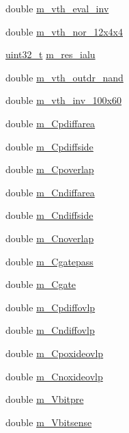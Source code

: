 \begin{DoxyCompactItemize}
\item 
double \hyperlink{classTechParameter_a8f9ab66c94f1883ffcaafa4b021f45a8}{m\_\-vth\_\-eval\_\-inv}
\item 
double \hyperlink{classTechParameter_a2ddcec55aa930cfc11b008d621182ede}{m\_\-vth\_\-nor\_\-12x4x4}
\item 
\hyperlink{Type_8hh_a435d1572bf3f880d55459d9805097f62}{uint32\_\-t} \hyperlink{classTechParameter_a3ae150f46fd55970a337d200f049ef39}{m\_\-res\_\-ialu}
\item 
double \hyperlink{classTechParameter_a3cd69bdb79973a2f4182e31be7838582}{m\_\-vth\_\-outdr\_\-nand}
\item 
double \hyperlink{classTechParameter_aff8cf010ff263ca60e53b1be45a68eb6}{m\_\-vth\_\-inv\_\-100x60}
\item 
double \hyperlink{classTechParameter_a5fe5f3f48a711d8df9b04ff7e0fd533e}{m\_\-Cpdiffarea}
\item 
double \hyperlink{classTechParameter_a4108836653116840cf95fcc824ca4d54}{m\_\-Cpdiffside}
\item 
double \hyperlink{classTechParameter_aa47b17efe11ece0c4a17879612070879}{m\_\-Cpoverlap}
\item 
double \hyperlink{classTechParameter_a50acace6ed30672be08e135f585fa3a0}{m\_\-Cndiffarea}
\item 
double \hyperlink{classTechParameter_ad604e4d831cada7764fc0417ef935e40}{m\_\-Cndiffside}
\item 
double \hyperlink{classTechParameter_a5d8fe6321d36214f3fd7b4313d5be2f4}{m\_\-Cnoverlap}
\item 
double \hyperlink{classTechParameter_acd05c6362e5b40cb41695a312f4a47ca}{m\_\-Cgatepass}
\item 
double \hyperlink{classTechParameter_ab12599ffb7e2b7794c4c6ffd26dff23f}{m\_\-Cgate}
\item 
double \hyperlink{classTechParameter_a6bafcb895f9ee83f48cfe8cf6f9b5044}{m\_\-Cpdiffovlp}
\item 
double \hyperlink{classTechParameter_a3aa498098469dd7f4acd47bab7874b39}{m\_\-Cndiffovlp}
\item 
double \hyperlink{classTechParameter_a9e3ed9c58d12083d34fd186a42bb8053}{m\_\-Cpoxideovlp}
\item 
double \hyperlink{classTechParameter_a7f07ce8a216e1f864d5746886fcc81a1}{m\_\-Cnoxideovlp}
\item 
double \hyperlink{classTechParameter_af56b64ff90fd9ef0c765de2e24defe12}{m\_\-Vbitpre}
\item 
double \hyperlink{classTechParameter_ad41da9214933687a780410e66be9138d}{m\_\-Vbitsense}

\end{DoxyCompactItemize}
